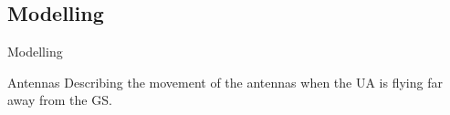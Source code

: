 \subsection{Modelling}

\begin{frame}{Modelling}
  \begin{block}{Antennas}
      Describing the movement of the antennas when the UA is flying far away from the GS. 
    \end{block}

  \begin{figure}[H]
    \centerline{
    }
  \end{figure}
\end{frame}

